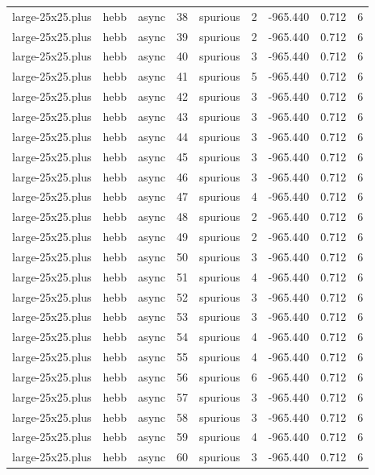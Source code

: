 \begin{tabular}{lllrlrrrr}
large-25x25.plus & hebb & async & 38 & spurious & 2 & -965.440 & 0.712 & 6 \\
large-25x25.plus & hebb & async & 39 & spurious & 2 & -965.440 & 0.712 & 6 \\
large-25x25.plus & hebb & async & 40 & spurious & 3 & -965.440 & 0.712 & 6 \\
large-25x25.plus & hebb & async & 41 & spurious & 5 & -965.440 & 0.712 & 6 \\
large-25x25.plus & hebb & async & 42 & spurious & 3 & -965.440 & 0.712 & 6 \\
large-25x25.plus & hebb & async & 43 & spurious & 3 & -965.440 & 0.712 & 6 \\
large-25x25.plus & hebb & async & 44 & spurious & 3 & -965.440 & 0.712 & 6 \\
large-25x25.plus & hebb & async & 45 & spurious & 3 & -965.440 & 0.712 & 6 \\
large-25x25.plus & hebb & async & 46 & spurious & 3 & -965.440 & 0.712 & 6 \\
large-25x25.plus & hebb & async & 47 & spurious & 4 & -965.440 & 0.712 & 6 \\
large-25x25.plus & hebb & async & 48 & spurious & 2 & -965.440 & 0.712 & 6 \\
large-25x25.plus & hebb & async & 49 & spurious & 2 & -965.440 & 0.712 & 6 \\
large-25x25.plus & hebb & async & 50 & spurious & 3 & -965.440 & 0.712 & 6 \\
large-25x25.plus & hebb & async & 51 & spurious & 4 & -965.440 & 0.712 & 6 \\
large-25x25.plus & hebb & async & 52 & spurious & 3 & -965.440 & 0.712 & 6 \\
large-25x25.plus & hebb & async & 53 & spurious & 3 & -965.440 & 0.712 & 6 \\
large-25x25.plus & hebb & async & 54 & spurious & 4 & -965.440 & 0.712 & 6 \\
large-25x25.plus & hebb & async & 55 & spurious & 4 & -965.440 & 0.712 & 6 \\
large-25x25.plus & hebb & async & 56 & spurious & 6 & -965.440 & 0.712 & 6 \\
large-25x25.plus & hebb & async & 57 & spurious & 3 & -965.440 & 0.712 & 6 \\
large-25x25.plus & hebb & async & 58 & spurious & 3 & -965.440 & 0.712 & 6 \\
large-25x25.plus & hebb & async & 59 & spurious & 4 & -965.440 & 0.712 & 6 \\
large-25x25.plus & hebb & async & 60 & spurious & 3 & -965.440 & 0.712 & 6 \\

\end{tabular}
